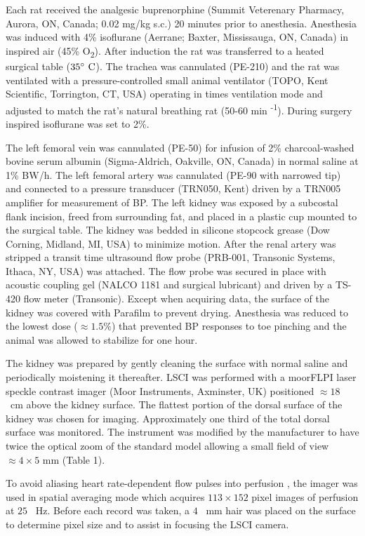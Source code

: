 	Each rat received the analgesic buprenorphine (Summit Veterenary Pharmacy, Aurora, ON, Canada; 0.02 mg/kg s.c.) 20 minutes prior to anesthesia. Anesthesia was induced with 4\% isoflurane (Aerrane; Baxter, Mississauga, ON, Canada) in inspired air (45\% O\textsubscript{2}). After induction the rat was transferred to a heated surgical table ($35 ^{\circ} \ {\rm C}$). The trachea was cannulated (PE-210) and the rat was ventilated with a pressure-controlled small animal ventilator (TOPO, Kent Scientific, Torrington, CT, USA) operating in times ventilation mode and adjusted to match the rat's natural breathing rat (50-60 min \textsuperscript{-1}). During surgery inspired isoflurane was set to 2\%.
	
	The left femoral vein was cannulated (PE-50) for infusion of 2\% charcoal-washed bovine serum albumin (Sigma-Aldrich, Oakville, ON, Canada) in normal saline at 1\% BW/h. The left femoral artery was cannulated (PE-90 with narrowed tip) and connected to a pressure transducer (TRN050, Kent) driven by a TRN005 amplifier for measurement of BP. The left kidney was exposed by a subcostal flank incision, freed from surrounding fat, and placed in a plastic cup mounted to the surgical table. The kidney was bedded in silicone stopcock grease (Dow Corning, Midland, MI, USA) to minimize motion. After the renal artery was stripped a transit time ultrasound flow probe (PRB-001, Transonic Systems, Ithaca, NY, USA) was attached. The flow probe was secured in place with acoustic coupling gel (NALCO 1181 and surgical lubricant) and driven by a TS-420 flow meter (Transonic). Except when acquiring data, the surface of the kidney was covered with Parafilm to prevent drying. Anesthesia was reduced to the lowest dose ($\approx 1.5\%$) that prevented BP responses to toe pinching and the animal was allowed to stabilize for one hour.
	
	The kidney was prepared by gently cleaning the surface with normal saline and periodically moistening it thereafter. LSCI was performed with a moorFLPI laser speckle contrast imager (Moor Instruments, Axminster, UK) positioned $\approx 18$ \ cm above the kidney surface. The flattest portion of the dorsal surface of the kidney was chosen for imaging. Approximately one third of the total dorsal surface was monitored. The instrument was modified by the manufacturer to have twice the optical zoom of the standard model allowing a small field of view $\approx 4\times 5$ mm (Table 1).
	
	To avoid aliasing heart rate-dependent flow pulses into perfusion \cite{Scully13}, the imager was used in spatial averaging mode which acquires $113 \times 152$ pixel images of perfusion at $25$ \ Hz. Before each record was taken, a $4$ \ mm hair was placed on the surface to determine pixel size and to assist in focusing the LSCI camera. 
	
